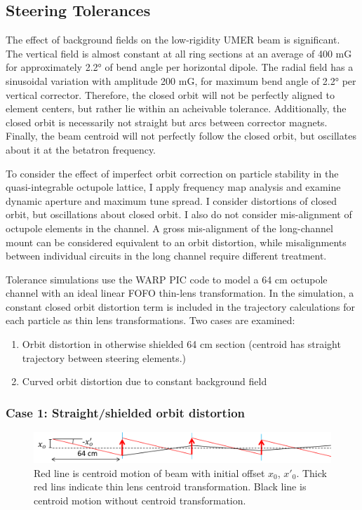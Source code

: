 \subsection{Steering Tolerances}

The effect of background fields on the low-rigidity UMER beam is significant.  The vertical field is almost constant at all ring sections at an average of 400 mG for approximately 2.2° of bend angle per horizontal dipole. The radial field has a sinusoidal variation with amplitude 200 mG, for maximum bend angle of 2.2° per vertical corrector. Therefore, the closed orbit will not be perfectly aligned to element centers, but rather lie within an acheivable tolerance. Additionally, the closed orbit is necessarily not straight but arcs between corrector magnets. Finally, the beam centroid will not perfectly follow the closed orbit, but oscillates about it at the betatron frequency. 

To consider the effect of imperfect orbit correction on particle stability in the quasi-integrable octupole lattice, I apply frequency map analysis and examine dynamic aperture and maximum tune spread. I consider distortions of closed orbit, but oscillations about closed orbit. I also do not consider mis-alignment of octupole elements in the channel. A gross mis-alignment of the long-channel mount can be considered equivalent to an orbit distortion, while misalignments between individual circuits in the long channel require different treatment.

Tolerance simulations use the WARP PIC code to model a 64 cm octupole channel with an ideal linear FOFO thin-lens transformation. In the simulation, a constant closed orbit distortion term is included in the trajectory calculations for each particle as thin lens transformations. Two cases are examined:

\begin{enumerate}
\item Orbit distortion in otherwise shielded 64 cm section (centroid has straight trajectory between steering elements.)
\item Curved orbit distortion due to constant background field
\end{enumerate}

\subsubsection{Case 1: Straight/shielded orbit distortion}

\begin{figure}
\centering
\includegraphics[width=\textwidth]{5.figures/steeringtolerance/orbit_distortion_cartoon.png}
\caption{Red line is centroid motion of beam with initial offset $x_0$, $x'_0$. Thick red lins indicate thin lens centroid transformation. Black line is centroid motion without centroid transformation.}
\label{fig:straightorbitdistortion}
\end{figure}

